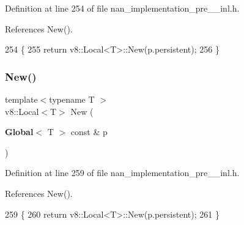 Definition at line 254 of file nan\+\_\+implementation\+\_\+pre\+\_\+\_\+inl.\+h.



References New().


\begin{DoxyCode}
254                                                  \{
255   \textcolor{keywordflow}{return} v8::Local<T>::New(p.persistent);
256 \}
\end{DoxyCode}
\mbox{\label{nan__implementation__pre__12__inl_8h_a2c93beb386312e1982816de2fede732f}} 
\subsubsection{New()\hspace{0.1cm}{\footnotesize\ttfamily [4/4]}}
{\footnotesize\ttfamily template$<$typename T $>$ \\
v8\+::\+Local$<$T$>$ New (\begin{DoxyParamCaption}\item[{\textbf{ Global}$<$ T $>$ const \&}]{p }\end{DoxyParamCaption})}



Definition at line 259 of file nan\+\_\+implementation\+\_\+pre\+\_\+\_\+inl.\+h.



References New().


\begin{DoxyCode}
259                                           \{
260   \textcolor{keywordflow}{return} v8::Local<T>::New(p.persistent);
261 \}
\end{DoxyCode}
